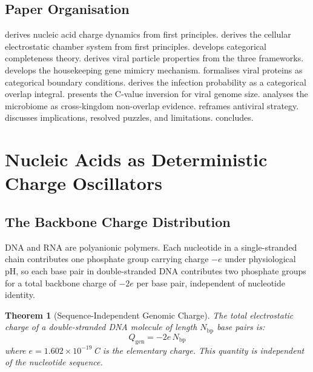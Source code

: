 \documentclass[11pt,twocolumn,a4paper]{article}
\newtheorem{theorem}{Theorem}[section]
\theoremstyle{definition}
\theoremstyle{remark}
\newcommand{\Qgen}{Q_{\mathrm{gen}}}
\begin{document}
\subsection{Paper Organisation}

 derives nucleic acid charge dynamics from first principles.  derives the cellular electrostatic chamber system from first principles.  develops categorical completeness theory.  derives viral particle properties from the three frameworks.  develops the housekeeping gene mimicry mechanism.  formalises viral proteins as categorical boundary conditions.  derives the infection probability as a categorical overlap integral.  presents the C-value inversion for viral genome size.  analyses the microbiome as cross-kingdom non-overlap evidence.  reframes antiviral strategy.  discusses implications, resolved puzzles, and limitations.  concludes.

\section{Nucleic Acids as Deterministic Charge Oscillators}
\label{sec:nacid}

\subsection{The Backbone Charge Distribution}

DNA and RNA are polyanionic polymers. Each nucleotide in a single-stranded chain contributes one phosphate group carrying charge $-e$ under physiological pH, so each base pair in double-stranded DNA contributes two phosphate groups for a total backbone charge of $-2e$ per base pair, independent of nucleotide identity.

\begin{theorem}[Sequence-Independent Genomic Charge]
\label{thm:genome_charge}
The total electrostatic charge of a double-stranded DNA molecule of length $N_{\mathrm{bp}}$ base pairs is:
\begin{equation}
  \Qgen = -2e \, N_{\mathrm{bp}}
  \label{eq:genome_charge}
\end{equation}
where $e = 1.602 \times 10^{-19}$\,C is the elementary charge. This quantity is independent of the nucleotide sequence.
\end{theorem}
\end{document}
